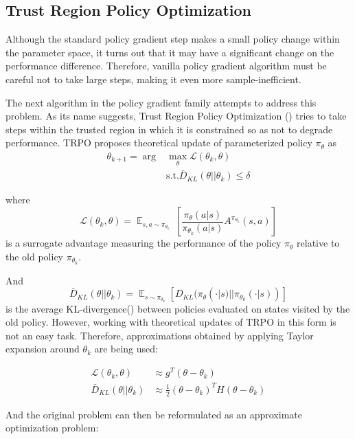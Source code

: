 \subsection{Trust Region Policy Optimization}
Although the standard policy gradient step makes a small policy change within the parameter space, it turns out that it may have a significant change on the performance difference.
Therefore, vanilla policy gradient algorithm must be careful not to take large steps, making it even more sample-inefficient.

The next algorithm in the policy gradient family attempts to address this problem.
As its name suggests, Trust Region Policy Optimization (\cite{TRPO}) tries to take steps within the trusted region in which it is constrained so as not to degrade performance.
TRPO proposes theoretical update of parameterized policy $\pi_\theta$ as
\begin{align*}
  \theta_{k+1} = \arg &\max_\theta \mathcal{L}(\theta_k,\theta)   \\  
  &\text{s.t.}  \bar{D}_{KL}(\theta||\theta_k) \leq \delta
\end{align*}

where \[\mathcal{L}(\theta_k,\theta) = \mathop{\mathbb{E}}_{s,a \sim \pi_{\theta_k}} \ \left[ \frac{\pi_\theta(a|s)}{\pi_{\theta_k}(a|s)}A^{\pi_{\theta_k}} (s,a) \right] \]
is a surrogate advantage measuring the performance of the policy $\pi_\theta$ relative to the old policy $\pi_{\theta_k}$.

And \[\bar{D}_{KL}(\theta||\theta_k) = \mathop{\mathbb{E}}_{s \sim \pi_{\theta_k}}[D_{KL}(\pi_\theta(\cdot|s)||\pi_{\theta_k}(\cdot|s))]\] is the average KL-divergence(\cite{KLDIV}) between policies evaluated on \newline  
states visited by the old policy.
However, working with theoretical updates of TRPO in this form is not an easy task. 
Therefore, approximations obtained by applying Taylor expansion around $\theta_k$ are being used:

\begin{align*}
  \mathcal{L}(\theta_k,\theta) &\approx g^T(\theta - \theta_k) \\
  \bar{D}_{KL}(\theta||\theta_k) &\approx \frac{1}{2} (\theta-\theta_k)^TH(\theta-\theta_k)
\end{align*}

And the original problem can then be reformulated as an approximate optimization problem:

